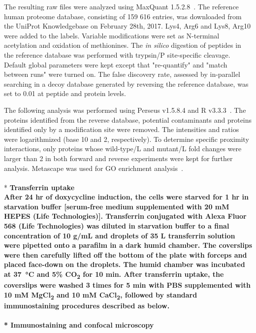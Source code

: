 The resulting raw files were analyzed using MaxQuant 1.5.2.8~\cite{Cox}. The reference human proteome database, consisting of 159 616 entries, was downloaded from the UniProt Knowledgebase on February 28th, 2017. Lys4, Arg6 and Lys8, Arg10 were added to the labels. Variable modifications were set as N-terminal acetylation and oxidation of methionines. The \textit{in silico} digestion of peptides in the reference database was performed with trypsin/P site-specific cleavage. Default global parameters were kept except that "re-quantify" and "match between runs" were turned on. The false discovery rate, assessed by in-parallel searching in a decoy database generated by reversing the reference database, was set to 0.01 at peptide and protein levels. 

The following analysis was performed using Perseus v1.5.8.4 and R v3.3.3~\cite{Tyanova}. The proteins identified from the reverse database, potential contaminants and proteins identified only by a modification site were removed. The intensities and ratios were logarithmized (base 10 and 2, respectively). To determine specific proximity interactions, only proteins whose wild-type/L and mutant/L fold changes were larger than 2 in both forward and reverse experiments were kept for further analysis. Metascape was used for GO enrichment analysis~\cite{Tripathi}.
\\
\\*
\bfseries{Transferrin uptake}\\
\normalfont After 24 hr of doxycycline induction, the cells were starved for 1 hr in starvation buffer [serum-free medium supplemented with 20 mM HEPES (Life Technologies)]. Transferrin conjugated with Alexa Fluor 568 (Life Technologies) was diluted in starvation buffer to a final concentration of 10 {}\textmu g/mL and droplets of 35 {}\textmu L transferrin solution were pipetted onto a parafilm in a dark humid chamber. The coverslips were then carefully lifted off the bottom of the plate with forceps and placed face-down on the droplets. The humid chamber was incubated at \SI{37}{\celsius} and 5\% CO\textsubscript{2} for 10 min. After transferrin uptake, the coverslips were washed 3 times for 5 min with PBS supplemented with 10 mM MgCl\textsubscript{2} and 10 mM CaCl\textsubscript{2}, followed by standard immunostaining procedures described as below.
\\
\\*
\bfseries{Immunostaining and confocal microscopy}\\
